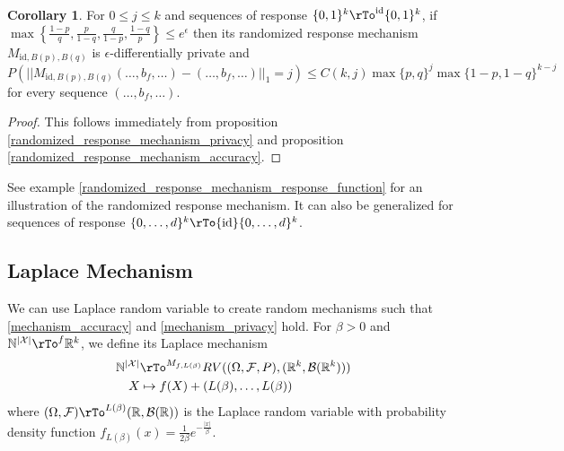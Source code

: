 \documentclass[12pt]{amsart}
\theoremstyle{definition}
\newtheorem{corollary}[theorem]{Corollary}
\begin{document}
\begin{corollary} \label{randomized_response_mechanism_accuracy_one_case} For $0 \leq j \leq k$ and sequences of response $\{0, 1\}^k \rTo^{\text{id}} \{0, 1\}^k$, if $\max \left\{ \frac{1 - p}{q}, \frac{p}{1 - q}, \frac{q}{1 - p}, \frac{1 - q}{p} \right\} \leq e^{\epsilon}$ then its randomized response mechanism $M_{\text{id}, B(p), B(q)}$ is $\epsilon$-differentially private and
$$P(||M_{\text{id}, B(p), B(q)}(\dots , b_f, \dots) - (\dots , b_f, \dots)||_1 = j) \leq C(k, j) \max\{p, q\}^j \max\{1 - p, 1 - q\}^{k - j}$$
for every sequence $(\dots , b_f, \dots)$.
\end{corollary}
\begin{proof} This follows immediately from proposition \ref{randomized_response_mechanism_privacy} and proposition \ref{randomized_response_mechanism_accuracy}.
\end{proof}

See example \ref{randomized_response_mechanism_response_function} for an illustration of the randomized response mechanism. It can also be generalized for sequences of response $\{0, \dots , d\}^k \rTo{\text{id}} \{0, \dots , d\}^k$.

\subsection{Laplace Mechanism} \label{laplace_mechanism} We can use Laplace random variable to create random mechanisms such that \ref{mechanism_accuracy} and \ref{mechanism_privacy} hold.
\dfn \label{dfn_laplace_mechanism} For $\beta > 0$ and $\mathbb{N}^{|\mathcal{X}|} \rTo^f \mathbb{R}^k$, we define its Laplace mechanism
\begin{align*}
\mathbb{N}^{|\mathcal{X}|} & \rTo^{M_{f, L(\beta)}} RV((\Omega, \mathcal{F}, P), (\mathbb{R}^k, \mathcal{B}(\mathbb{R}^k))) \\
X & \mapsto f(X) + (L(\beta), \dots, L(\beta)) \\
\end{align*}
where $(\Omega, \mathcal{F}) \rTo^{L(\beta)} (\mathbb{R}, \mathcal{B}({\mathbb{R}}))$ is the Laplace random variable with probability density function $f_{L(\beta)}(x) = \frac{1}{2 \beta} e^{- \frac{|x|}{\beta}}$.
\end{document}
